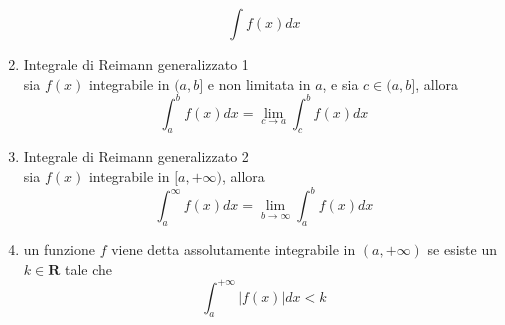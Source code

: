 \documentclass{exam}
\begin{document}
\begin{enumerate}
				\begin{equation}
					\int f(x)dx
				\end{equation}
			\item{Integrale di Reimann generalizzato 1}\\
				sia $f(x)$ integrabile in $(a,b]$ e non limitata in $a$, e sia $c\in (a,b]$, allora 
				\begin{equation}
					\int_a^b f(x)dx = \lim_{c\to a}\int_c^b f(x)dx
				\end{equation}
			\item{Integrale di Reimann generalizzato 2}\\
				sia $f(x)$ integrabile in $[a,+\infty)$, allora
				\begin{equation}
					\int_a^\infty f(x)dx=\lim_{b\to \infty}\int_a^b f(x)dx
				\end{equation}
			\item
				un funzione $f$ viene detta assolutamente integrabile in $(a,+\infty)$ se esiste un $k\in\mathbf{R}$ tale che 
				\begin{equation}
					\int_a^{+\infty}|f(x)|dx < k
				\end{equation}
		\end{enumerate}
			
\end{document}
